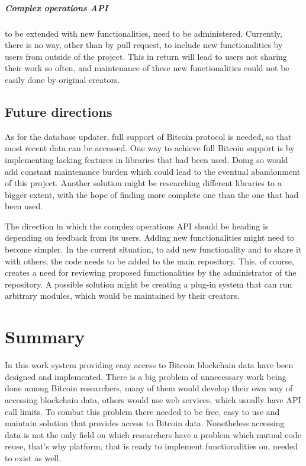 \documentclass[12pt, en, eng, twoside, final]{mgr}
\begin{document}
\paragraph{Complex operations API} to be extended with new functionalities, need to be administered. Currently, there is no way, other than by pull request, to include new functionalities by users from outside of the project. This in return will lead to users not sharing their work so often, and maintenance of these new functionalities could not be easily done by original creators.

\section{Future directions}
As for the database updater, full support of Bitcoin protocol is needed, so that most recent data can be accessed. One way to achieve full Bitcoin support is by implementing lacking features in libraries that had been used. Doing so would add constant maintenance burden which could lead to the eventual abandonment of this project. Another solution might be researching different libraries to a bigger extent, with the hope of finding more complete one than the one that had been used.

The direction in which the complex operations API should be heading is depending on feedback from its users. Adding new functionalities might need to become simpler. In the current situation, to add new functionality and to share it with others, the code needs to be added to the main repository. This, of course, creates a need for reviewing proposed functionalities by the administrator of the repository. A possible solution might be creating a plug-in system that can run arbitrary modules, which would be maintained by their creators. 

\chapter{Summary}
In this work system providing easy access to Bitcoin blockchain data have been designed and implemented. There is a big problem of unnecessary work being done among Bitcoin researchers, many of them would develop their own way of accessing blockchain data, others would use web services, which usually have API call limits. To combat this problem there needed to be free, easy to use and maintain solution that provides access to Bitcoin data. 
Nonetheless accessing data is not the only field on which researchers have a problem which mutual code reuse, that's why platform, that is ready to implement functionalities on, needed to exist as well. 
\end{document}
